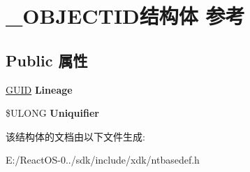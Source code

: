 \hypertarget{struct___o_b_j_e_c_t_i_d}{}\section{\+\_\+\+O\+B\+J\+E\+C\+T\+I\+D结构体 参考}
\label{struct___o_b_j_e_c_t_i_d}
\subsection*{Public 属性}
\begin{DoxyCompactItemize}
\item 
\mbox{\label{struct___o_b_j_e_c_t_i_d_a7f90f281377cbc1e7cf5b6bd86c3cd8e}} 
\hyperlink{interface_g_u_i_d}{G\+U\+ID} {\bfseries Lineage}
\item 
\mbox{\label{struct___o_b_j_e_c_t_i_d_ad00db58a5c77481be6e0fb2e15390c9b}} 
\$U\+L\+O\+NG {\bfseries Uniquifier}
\end{DoxyCompactItemize}


该结构体的文档由以下文件生成\+:\begin{DoxyCompactItemize}
\item 
E\+:/\+React\+O\+S-\/0../sdk/include/xdk/ntbasedef.\+h\end{DoxyCompactItemize}
